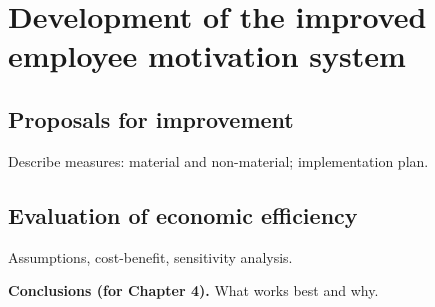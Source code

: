 \chapter{Development of the improved employee motivation system}
\section{Proposals for improvement}
Describe measures: material and non-material; implementation plan.

\section{Evaluation of economic efficiency}
Assumptions, cost-benefit, sensitivity analysis.

\noindent\textbf{Conclusions (for Chapter 4).} What works best and why.
